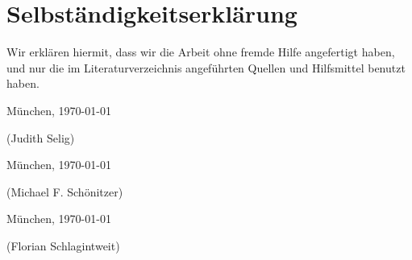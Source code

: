 
\section*{Selbständigkeitserklärung}

Wir erklären hiermit, dass wir die Arbeit ohne fremde Hilfe
angefertigt haben, und nur die im Literaturverzeichnis angeführten
Quellen und Hilfsmittel benutzt haben.

\vspace{1cm}\noindent
München, \today \quad
\begin{minipage}[t]{6cm} %
\dotfill
\begin{center}
\small (Judith Selig)
\end{center}
\end{minipage}

\bigskip

\vspace{1cm}\noindent
München, \today \quad
\begin{minipage}[t]{6cm} %
\dotfill
\begin{center}
\small (Michael F. Schönitzer)
\end{center}
\end{minipage}

\bigskip

\vspace{1cm}\noindent
München, \today \quad
\begin{minipage}[t]{6cm} %
\dotfill
\begin{center}
\small (Florian Schlagintweit)
\end{center}
\end{minipage}